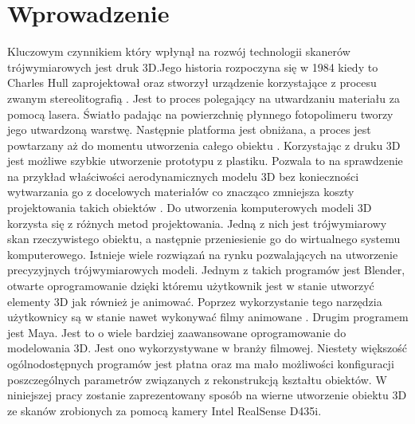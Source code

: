 \section{Wprowadzenie}
Kluczowym czynnikiem który wpłynął na rozwój technologii skanerów trójwymiarowych jest druk 3D.Jego historia rozpoczyna się w 1984 kiedy to Charles Hull zaprojektował oraz stworzył urządzenie korzystające z procesu zwanym stereolitografią \cite{gokhare2017review}. Jest to proces polegający na utwardzaniu materiału za pomocą lasera. Światło padając na powierzchnię płynnego fotopolimeru tworzy jego utwardzoną warstwę. Następnie platforma jest obniżana, a proces jest powtarzany aż do momentu utworzenia całego obiektu \cite{gokhare2017review}. Korzystając z druku 3D jest możliwe szybkie utworzenie prototypu z plastiku. Pozwala to na sprawdzenie na przykład właściwości aerodynamicznych modelu 3D bez konieczności wytwarzania go z docelowych materiałów co znacząco zmniejsza koszty projektowania takich obiektów \cite{bassett20153d}. Do utworzenia komputerowych modeli 3D korzysta się z różnych metod projektowania. Jedną z nich jest trójwymiarowy skan rzeczywistego obiektu, a następnie przeniesienie go do wirtualnego systemu komputerowego. Istnieje wiele rozwiązań na rynku pozwalających na utworzenie precyzyjnych trójwymiarowych modeli. Jednym z takich programów jest Blender, otwarte oprogramowanie dzięki któremu użytkownik jest w stanie utworzyć elementy 3D jak również je animować. Poprzez wykorzystanie tego narzędzia użytkownicy są w stanie nawet wykonywać filmy animowane \cite{BlenderMovies}. Drugim programem jest Maya. Jest to o wiele bardziej zaawansowane oprogramowanie do modelowania 3D. Jest ono wykorzystywane w branży filmowej. Niestety większość ogólnodostępnych programów jest płatna oraz ma mało możliwości konfiguracji poszczególnych parametrów związanych z rekonstrukcją kształtu obiektów. W niniejszej pracy zostanie zaprezentowany sposób na wierne utworzenie obiektu 3D ze skanów zrobionych za pomocą kamery Intel RealSense D435i.